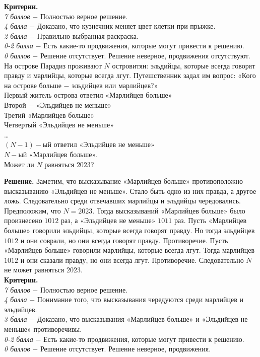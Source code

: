 \textbf{Критерии.} \\
\textit{7 баллов} $-$ Полностью верное решение.\\ 
\textit{4 балла} $-$ Доказано, что кузнечник меняет цвет клетки при прыжке.\\ 
\textit{2 балла} $-$ Правильно выбранная раскраска.\\
\textit{0-2 балла} $-$ Есть какие-то продвижения, которые могут привести к решению.\\
\textit{0 баллов} $-$ Решение отсутствует. Решение неверное, продвижения отсутствуют. \\ 

 На острове Парадиз проживают $N$ островитян: эльдийцы, которые всегда говорят правду и марлийцы, которые всегда лгут. Путешственник задал им вопрос: «Кого на острове больше $-$ эльдийцев или марлийцев?» \\
Первый житель острова ответил «Марлийцев больше» \\ 
Второй $-$ «Эльдийцев не меньше» \\
Третий «Марлийцев больше» \\
Четвертый «Эльдийцев не меньше» \\
… \\
$(N-1)-$ый ответил «Эльдийцев не меньше» \\
$N-$ый «Марлийцев больше». \\
Может ли $N$ равняться $2023$? \par

\textbf{Решение.} Заметим, что высказывание «Марлийцев больше» противоположно высказыванию «Эльдийцев не меньше». Стало быть одно из них правда, а другое ложь. Следовательно среди отвечавших марлийцы и эльдийцы чередовались. Предположим, что $N = 2023$. Тогда высказываний «Марлийцев больше» было произнесено $1012$ раз, а «Эльдийцев не меньше» $1011$ раз. Пусть «Марлийцев больше» говорили эльдийцы, которые всегда говорят правду. Но тогда эльдийцев $1012$ и они соврали, но они всегда говорят правду. Противоречие. Пусть «Марлийцев больше» говорили марлийцы, которые всегда лгут. Тогда марлийцев $1012$ и они сказали правду, но они всегда лгут. Противоречие. Следовательно $N$ не может равняться $2023$. \\

\textbf{Критерии.} \\
\textit{7 баллов} $-$ Полностью верное решение.\\ 
\textit{4 балла} $-$ Понимание того, что высказывания чередуются среди марлийцев и эльдийцев.\\
\textit{3 балла} $-$ Доказано, что высказывания «Марлийцев больше» и «Эльдийцев не меньше» противоречивы.\\
\textit{0-2 балла} $-$ Есть какие-то продвижения, которые могут привести к решению. \\
\textit{0 баллов} $-$ Решение отсутствует. Решение неверное, продвижения.\\
